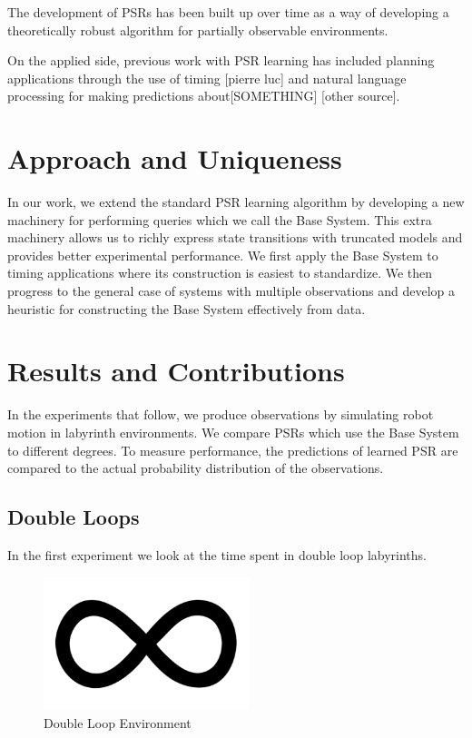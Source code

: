 \documentclass{acm_proc_article-sp}
\begin{document}
The development of PSRs has been built up over time as a way of developing a theoretically robust algorithm for partially observable environments. 

On the applied side, previous work with PSR learning has included planning applications through the use of timing [pierre luc] and natural language processing for making predictions about[SOMETHING] [other source]. 

\section{Approach and Uniqueness} 

In our work, we extend the standard PSR learning algorithm by developing a new machinery for performing queries which we call the Base System. This extra machinery allows us to  richly express state transitions with truncated models and provides better experimental performance. 
We first apply the Base System to timing applications where its construction is easiest to standardize. We then progress to the general case of systems with multiple observations and develop a heuristic for constructing the Base System effectively from data.

\section{Results and Contributions}

In the experiments that follow, we produce observations by simulating robot motion in labyrinth environments. We compare PSRs which use the Base System to different degrees. To measure performance, the predictions of learned PSR are compared to the actual probability distribution of the observations. 


\subsection{Double Loops}

In the first experiment we look at the time spent in double loop labyrinths. 


\begin{figure}[ht!]
\centering
\includegraphics[width=60mm]{lucasplots/doubleLoopImage.png}
\caption{Double Loop Environment\label{overflow}}
\end{figure}
\end{document}
